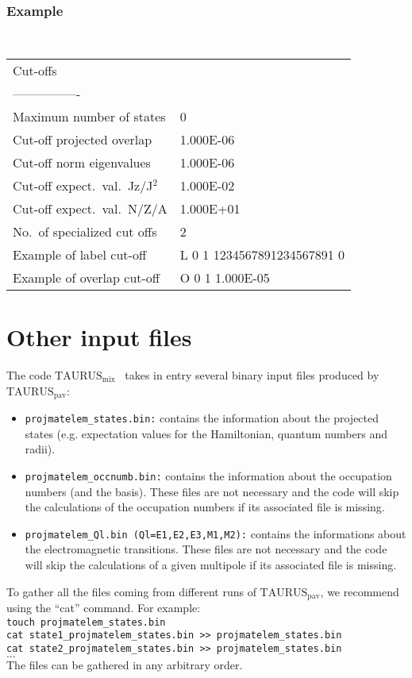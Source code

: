 \documentclass[a4paper,11pt]{article}
\newcommand{\TAURUSpav}{$\text{TAURUS}_{\text{pav}}$}
\newcommand{\TAURUSmix}{$\text{TAURUS}_{\text{mix}}$}
\newcommand{\ttt}[1]{\texttt{#1}}
\begin{document}
\subsubsection*{Example}
\begin{center}
\tt
\begin{tabular}{|ll|}
\hline
Cut-offs                      &          \\
----------------              &          \\
Maximum number of states      &0         \\
Cut-off projected overlap     &1.000E-06 \\
Cut-off norm eigenvalues      &1.000E-06 \\
Cut-off expect.~val.~Jz/J$^2$ &1.000E-02 \\
Cut-off expect.~val.~N/Z/A    &1.000E+01 \\
No.~of specialized cut offs   &2         \\
Example of label cut-off      &L \phantom{0}0 \phantom{0}1 1234567891234567891 \phantom{0}0  \\
Example of overlap cut-off    &O \phantom{0}0 \phantom{0}1 1.000E-05 \\
\hline
\end{tabular}
\end{center}

%
% 
\section{Other input files}

The code \TAURUSmix~ takes in entry several binary input files produced by \TAURUSpav: 
\begin{itemize}
  \item \ttt{projmatelem\_states.bin:} contains the information about the projected states (e.g. expectation values for the Hamiltonian, quantum numbers and radii).
  \item \ttt{projmatelem\_occnumb.bin:} contains the information about the occupation numbers (and the basis). These files are not necessary and the code will 
        skip the calculations of the occupation numbers if its associated file is missing. 
  \item \ttt{projmatelem\_Ql.bin (Ql=E1,E2,E3,M1,M2):} contains the informations about the electromagnetic transitions. These files are not necessary and the code will 
        skip the calculations of a given multipole if its associated file is missing. 
\end{itemize}
To gather all the files coming from different runs of \TAURUSpav, we recommend using the ``cat'' command. For example: \\
{\tt touch projmatelem\_states.bin} \\
{\tt cat state1\_projmatelem\_states.bin >> projmatelem\_states.bin} \\
{\tt cat state2\_projmatelem\_states.bin >> projmatelem\_states.bin} \\
{\tt $\ldots$} \\
The files can be gathered in any arbitrary order.

%
%
\end{document}
